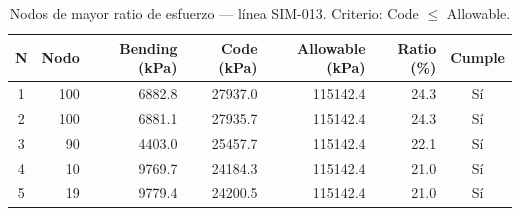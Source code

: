 \begin{table}[htbp]
  \centering
  \small
  \caption{Nodos de mayor ratio de esfuerzo — línea SIM-013. Criterio: Code $\leq$ Allowable.}
  \label{tab:top5-ratio}
  \begin{tabular}{crrrrrc}
    \toprule
    N & Nodo & Bending (\si{kPa}) & Code (\si{kPa}) & Allowable (\si{kPa}) & Ratio (\%) & Cumple \\
    \midrule
    1 & 100 & \num{6882.8} & \num{27937.0} & \num{115142.4} & 24.3 & Sí \\
    2 & 100 & \num{6881.1} & \num{27935.7} & \num{115142.4} & 24.3 & Sí \\
    3 & 90 & \num{4403.0} & \num{25457.7} & \num{115142.4} & 22.1 & Sí \\
    4 & 10 & \num{9769.7} & \num{24184.3} & \num{115142.4} & 21.0 & Sí \\
    5 & 19 & \num{9779.4} & \num{24200.5} & \num{115142.4} & 21.0 & Sí \\
    \bottomrule
  \end{tabular}
\end{table}
